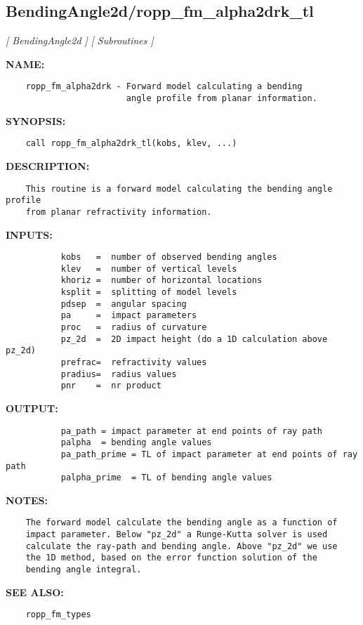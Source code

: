 \subsection{BendingAngle2d/ropp\_fm\_alpha2drk\_tl}
\textsl{[ BendingAngle2d ]}
\textsl{[ Subroutines ]}

\label{ch:robo9}
\label{ch:BendingAngle2d_ropp_fm_alpha2drk_tl}
\textbf{NAME:}\hspace{0.08in}\begin{Verbatim}
    ropp_fm_alpha2drk - Forward model calculating a bending
                        angle profile from planar information.
\end{Verbatim}
\textbf{SYNOPSIS:}\hspace{0.08in}\begin{Verbatim}
    call ropp_fm_alpha2drk_tl(kobs, klev, ...)
\end{Verbatim}
\textbf{DESCRIPTION:}\hspace{0.08in}\begin{Verbatim}
    This routine is a forward model calculating the bending angle profile
    from planar refractivity information.  
\end{Verbatim}
\textbf{INPUTS:}\hspace{0.08in}\begin{Verbatim}
           kobs   =  number of observed bending angles 
           klev   =  number of vertical levels
           khoriz =  number of horizontal locations
           ksplit =  splitting of model levels
           pdsep  =  angular spacing
           pa     =  impact parameters
           proc   =  radius of curvature 
           pz_2d  =  2D impact height (do a 1D calculation above pz_2d)
           prefrac=  refractivity values
           pradius=  radius values
           pnr    =  nr product 
\end{Verbatim}
\textbf{OUTPUT:}\hspace{0.08in}\begin{Verbatim}
           pa_path = impact parameter at end points of ray path
           palpha  = bending angle values 
           pa_path_prime = TL of impact parameter at end points of ray path
           palpha_prime  = TL of bending angle values 
\end{Verbatim}
\textbf{NOTES:}\hspace{0.08in}\begin{Verbatim}
    The forward model calculate the bending angle as a function of
    impact parameter. Below "pz_2d" a Runge-Kutta solver is used
    calculate the ray-path and bending angle. Above "pz_2d" we use
    the 1D method, based on the error function solution of the 
    bending angle integral.  
\end{Verbatim}
\textbf{SEE ALSO:}\hspace{0.08in}\begin{Verbatim}
    ropp_fm_types
\end{Verbatim}
